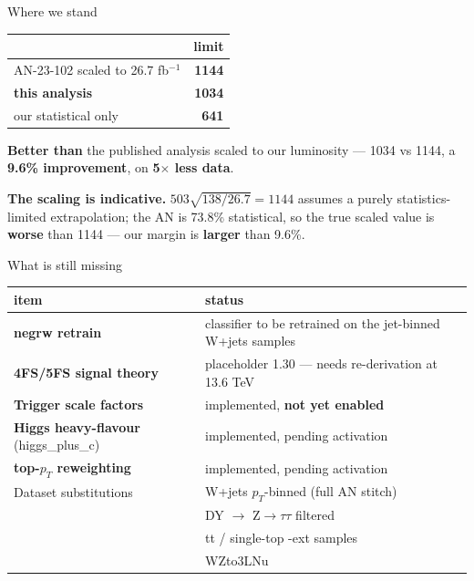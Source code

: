 \documentclass[aspectratio=169,10pt]{beamer}
\newcommand{\code}[1]{{\ttfamily\small\colorbox{codebg}{#1}}}
\begin{document}
\begin{frame}{Where we stand}
\vspace{0.4em}
\begin{center}
\begin{tabular}{lr}
\toprule
 & limit \\
\midrule
AN-23-102 scaled to 26.7 fb$^{-1}$ & \textbf{1144} \\
\textbf{this analysis} & \textbf{1034} \\
our statistical only & \textbf{641} \\
\bottomrule
\end{tabular}
\end{center}
\vspace{0.4em}
\begin{keybox}
\textbf{Better than} the published analysis scaled to our luminosity --- 1034 vs
1144, a \textbf{9.6\% improvement}, on \textbf{5$\times$ less data}.
\end{keybox}
\begin{warnbox}
\textbf{The scaling is indicative.} $503\sqrt{138/26.7}=1144$ assumes a purely
statistics-limited extrapolation; the AN is 73.8\% statistical, so the true scaled
value is \textbf{worse} than 1144 --- our margin is \textbf{larger} than 9.6\%.
\end{warnbox}
\end{frame}

\begin{frame}{What is still missing}
\vspace{0.3em}
\begin{center}
\small
\begin{tabular}{ll}
\toprule
item & status \\
\midrule
\textbf{negrw retrain} & classifier to be retrained on the jet-binned W+jets samples \\
\textbf{4FS/5FS signal theory} & placeholder 1.30 --- needs re-derivation at 13.6 TeV \\
\textbf{Trigger scale factors} & implemented, \textbf{not yet enabled} \\
\textbf{Higgs heavy-flavour} (\code{higgs\_plus\_c}) & implemented, pending activation \\
\textbf{top-$p_T$ reweighting} & implemented, pending activation \\
Dataset substitutions & W+jets $p_T$-binned (full AN stitch) \\
 & DY $\rightarrow$ Z$\rightarrow\tau\tau$ filtered \\
 & tt / single-top \code{-ext} samples \\
 & \code{WZto3LNu} \\
\bottomrule
\end{tabular}
\end{center}
\end{frame}
\end{document}
